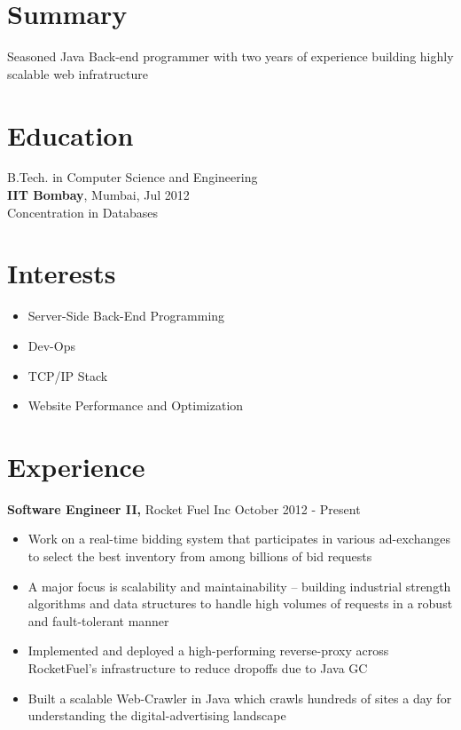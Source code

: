 \documentclass[margin]{res}
\begin{document}

\address{ \href{http://ankush.io/}{http://ankush.io} }
\address{ ankush@ankush.io }

\begin{resume}

\section{Summary}
  Seasoned Java Back-end programmer with two years of experience building highly scalable web infratructure

\section{Education}
  B.Tech. in Computer Science and Engineering \\
  {\bf IIT Bombay}, Mumbai, Jul 2012 \\
  Concentration in Databases

\section{Interests}
 \begin{itemize} \itemsep -2pt  %
 \item Server-Side Back-End Programming
 \item Dev-Ops
 \item TCP/IP Stack
 \item Website Performance and Optimization
 \end{itemize}

\section{Experience}
 {\bf Software Engineer II,} Rocket Fuel Inc \hfill October 2012 - Present
 \begin{itemize} \itemsep -2pt  %
 \item Work on a real-time bidding system that participates in various ad-exchanges to select the best inventory from among billions of bid requests
 \item A major focus is scalability and maintainability -- building industrial strength algorithms and data structures to handle high volumes of requests in a robust and fault-tolerant manner
 \item Implemented and deployed a high-performing reverse-proxy across RocketFuel's infrastructure to reduce dropoffs due to Java GC
 \item Built a scalable Web-Crawler in Java which crawls hundreds of sites a day for understanding the digital-advertising landscape
 \end{itemize}


\end{resume}
\end{document}
